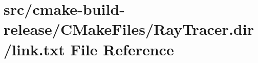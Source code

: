 \hypertarget{cmake-build-release_2CMakeFiles_2RayTracer_8dir_2link_8txt}{}\section{src/cmake-\/build-\/release/\+C\+Make\+Files/\+Ray\+Tracer.dir/link.txt File Reference}
\label{cmake-build-release_2CMakeFiles_2RayTracer_8dir_2link_8txt}
